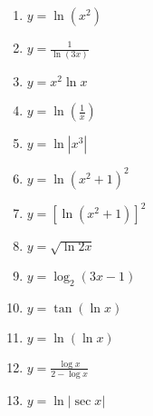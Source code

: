 \documentclass[12pt]{article}
\newif\ifans
\begin{document}
\begin{enumerate}

\item $y = \ln{(x^2)}$ 

\ifans{\fbox{$\frac{2}{x}$}} \fi

\item $y = \frac{1}{\ln{(3x)}}$ 

\ifans{\fbox{$-\frac{1}{x[\ln{(3x)}]^2}$}} \fi

\item $y = x^2\ln{x}$ 

\ifans{\fbox{$x+2x\ln{x}$}} \fi

\item $y = \ln{\left(\frac{1}{x}\right)}$ 

\ifans{\fbox{$-\frac{1}{x}$}} \fi

\item $y = \ln|x^3|$ 

\ifans{\fbox{$\frac{3}{x}$}} \fi

\item $y = \ln{(x^2+1)^2}$ 

\ifans{\fbox{$\frac{4x}{x^2+1}$}} \fi

\item $y = \left[\ln{(x^2+1)}\right]^2$ 

\ifans{\fbox{$\frac{4x\ln{(x^2+1)}}{x^2+1}$}} \fi

\item $y = \sqrt{\ln{2x}}$ 

\ifans{\fbox{$\frac{1}{2x\sqrt{\ln{(2x)}}}$}} \fi

\item $y = \log_{2}{(3x-1)}$ 

\ifans{\fbox{$\frac{3}{(3x-1)\ln2}$}} \fi

\item $y = \tan{(\ln{x})}$ 

\ifans{\fbox{$\frac{1}{x}\sec^{2}(\ln{x})$}} \fi

\item $y = \ln{(\ln x)}$ 

\ifans{\fbox{$\frac{1}{x\ln{x}}$}} \fi

\item $y=\frac{\log{x}}{2-\log{x}}$

\ifans{\fbox{$\frac{2}{x\ln{(10)}(2-\log{x})^2}$}} \fi

\item $y=\ln{|\sec{x}|}$

\ifans{\fbox{$\tan{x}$}} \fi


\end{enumerate}
\end{document}
